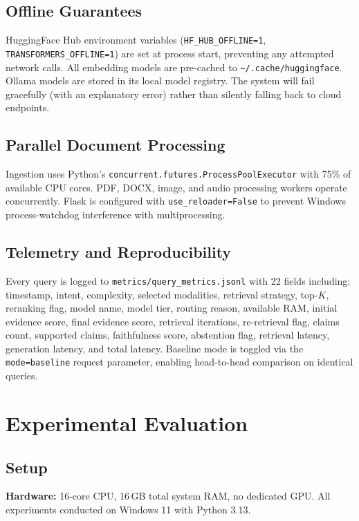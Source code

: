 \documentclass[conference]{IEEEtran}
\begin{document}
\subsection{Offline Guarantees}
HuggingFace Hub environment variables (\texttt{HF\_HUB\_OFFLINE=1},
\texttt{TRANSFORMERS\_OFFLINE=1}) are set at process start, preventing any
attempted network calls. All embedding models are pre-cached to
\texttt{\textasciitilde/.cache/huggingface}. Ollama models are stored in its
local model registry. The system will fail gracefully (with an explanatory
error) rather than silently falling back to cloud endpoints.

\subsection{Parallel Document Processing}
Ingestion uses Python's \texttt{concurrent.futures.ProcessPoolExecutor} with
75\% of available CPU cores. PDF, DOCX, image, and audio processing workers
operate concurrently. Flask is configured with \texttt{use\_reloader=False}
to prevent Windows process-watchdog interference with multiprocessing.

\subsection{Telemetry and Reproducibility}
Every query is logged to \texttt{metrics/query\_metrics.jsonl} with 22 fields
including: timestamp, intent, complexity, selected modalities, retrieval
strategy, top-$K$, reranking flag, model name, model tier, routing reason,
available RAM, initial evidence score, final evidence score, retrieval
iterations, re-retrieval flag, claims count, supported claims, faithfulness
score, abstention flag, retrieval latency, generation latency, and total
latency. Baseline mode is toggled via the \texttt{mode=baseline} request
parameter, enabling head-to-head comparison on identical queries.

\section{Experimental Evaluation}\label{sec:experiments}

\subsection{Setup}
\textbf{Hardware:} 16-core CPU, 16\,GB total system RAM, no dedicated GPU.
All experiments conducted on Windows 11 with Python 3.13.
\end{document}
